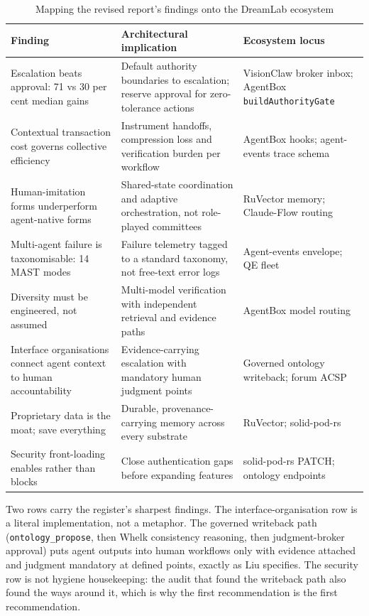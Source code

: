 \begin{table}[h]
\centering
\caption{Mapping the revised report's findings onto the DreamLab ecosystem}
\label{tab:findings-fit}
\begin{tabularx}{\textwidth}{L{4.6cm} X L{3.6cm}}
\toprule
\textbf{Finding} & \textbf{Architectural implication} & \textbf{Ecosystem locus} \\
\midrule
Escalation beats approval: 71 vs 30 per cent median gains \parencite{Pereira2026Playbook} & Default authority boundaries to escalation; reserve approval for zero-tolerance actions & VisionClaw broker inbox; AgentBox \texttt{buildAuthorityGate} \\
\addlinespace
Contextual transaction cost governs collective efficiency \parencite{Liu2026} & Instrument handoffs, compression loss and verification burden per workflow & AgentBox hooks; agent-events trace schema \\
\addlinespace
Human-imitation forms underperform agent-native forms \parencite{Liu2026} & Shared-state coordination and adaptive orchestration, not role-played committees & RuVector memory; Claude-Flow routing \\
\addlinespace
Multi-agent failure is taxonomisable: 14 MAST modes \parencite{Cemri2025} & Failure telemetry tagged to a standard taxonomy, not free-text error logs & Agent-events envelope; QE fleet \\
\addlinespace
Diversity must be engineered, not assumed \parencite{Liu2026} & Multi-model verification with independent retrieval and evidence paths & AgentBox model routing \\
\addlinespace
Interface organisations connect agent context to human accountability \parencite{Liu2026} & Evidence-carrying escalation with mandatory human judgment points & Governed ontology writeback; forum ACSP \\
\addlinespace
Proprietary data is the moat; save everything \parencite{Pereira2026Playbook} & Durable, provenance-carrying memory across every substrate & RuVector; solid-pod-rs \\
\addlinespace
Security front-loading enables rather than blocks \parencite{Pereira2026Playbook} & Close authentication gaps before expanding features & solid-pod-rs PATCH; ontology endpoints \\
\bottomrule
\end{tabularx}
\end{table}

Two rows carry the register's sharpest findings. The interface-organisation row is a literal implementation, not a metaphor. The governed writeback path (\texttt{ontology\_propose}, then Whelk consistency reasoning, then judgment-broker approval) puts agent outputs into human workflows only with evidence attached and judgment mandatory at defined points, exactly as Liu specifies. The security row is not hygiene housekeeping: the audit that found the writeback path also found the ways around it, which is why the first recommendation is the first recommendation.


